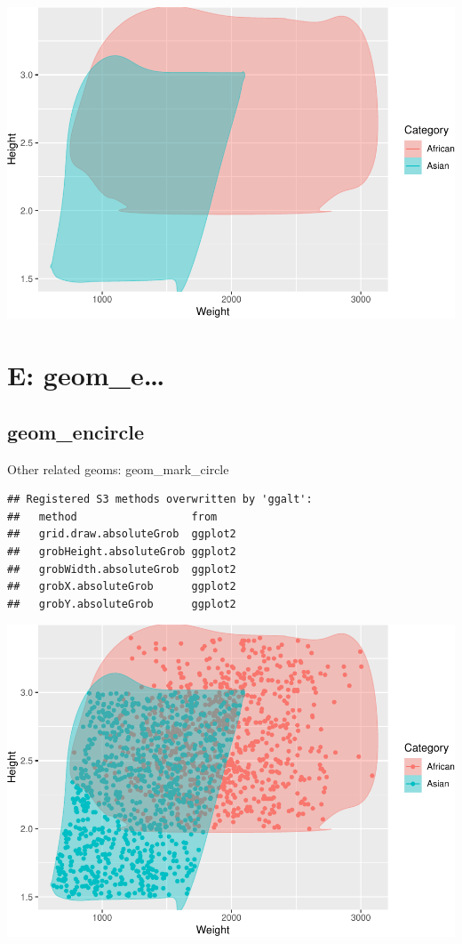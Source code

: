 \documentclass[
]{book}
\begin{document}
\includegraphics{Data-Visualisation-geom-Encyclopedia_files/figure-latex/unnamed-chunk-36-1.pdf}

\hypertarget{e-geom_e}{%
\chapter{E: geom\_e\ldots{}}\label{e-geom_e}}

\hypertarget{geom_encircle}{%
\section{geom\_encircle}\label{geom_encircle}}

Other related geoms: geom\_mark\_circle

\begin{verbatim}
## Registered S3 methods overwritten by 'ggalt':
##   method                  from   
##   grid.draw.absoluteGrob  ggplot2
##   grobHeight.absoluteGrob ggplot2
##   grobWidth.absoluteGrob  ggplot2
##   grobX.absoluteGrob      ggplot2
##   grobY.absoluteGrob      ggplot2
\end{verbatim}

\includegraphics{Data-Visualisation-geom-Encyclopedia_files/figure-latex/unnamed-chunk-37-1.pdf}
\end{document}
